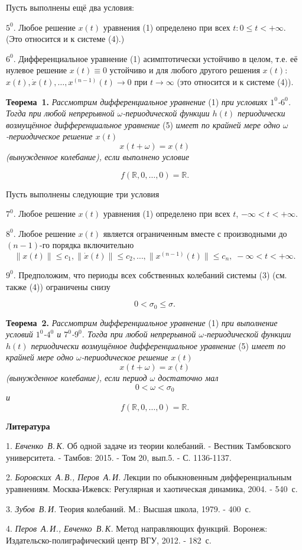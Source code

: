 Пусть выполнены ещё  два условия:

$5^0$. Любое решение $x(t)$ уравнения (1)  определено при всех $t:0\leqslant t< +\infty$.
(Это относится и к системе (4).)

$6^0$. Дифференциальное уравнение (1) асимптотически устойчиво в целом, т.е. её нулевое решение
$x(t)\equiv 0$ устойчиво и для любого другого решения $x(t)$:
$x(t), \dot x(t),\ldots , x^{(n-1)}(t)\rightarrow 0$ при  $t\rightarrow\infty$ (это относится и к системе (4)).

\textbf{Теорема~1.} {\it Рассмотрим дифференциальное уравнение} (1) {\it при условиях $1^0$-$6^0$. Тогда
	при любой непрерывной $\omega$-пе\-ри\-о\-ди\-чес\-кой функции  $h(t)$ периодически возмущённое дифференциальное
	уравнение} (5) {\it имеет по крайней мере одно $\omega$-периодическое решение  $x(t)$
		$$x(t+\omega)=x(t)$$
	(вынужденное колебание), если выполнено условие}

$$f(\mathbb{ R},0,\ldots,0)=\mathbb{ R}.$$



Пусть выполнены следующие три условия

$7^0$. Любое решение $x(t)$ уравнения (1) определено при всех $t$, $-\infty<t<+\infty$.

$8^0$. Любое решение $x(t)$ является ограниченным вместе с производными до $(n-1)$-го порядка включительно
$$\|x(t)\|\leqslant c_1, \|\dot{x}(t)\|\leqslant c_2, \ldots, \|x^{(n-1)}(t)\|\leqslant c_n,\;  -\infty<t<+\infty.$$

$9^0$. Предположим, что периоды всех собственных колебаний системы (3) (см. также (4)) ограничены снизу

$$ 0<\sigma_0 \leqslant \sigma. $$

\textbf{Теорема~2.} {\it Рассмотрим дифференциальное уравнение} (1) {\it при выполнение условий $1^0$-$4^0$ и $7^0$-$9^0$. Тогда
	при любой непрерывной  $\omega$-периодической функции  $h(t)$  периодически возмущённое дифференциальное
	уравнение} (5) {\it имеет по крайней мере одно $\omega$-периодическое решение  $x(t)$
		$$x(t+\omega)=x(t) $$
	(вынужденное колебание), если период $\omega$ достаточно мал
		$$0<\omega< \sigma_0 $$
	и}
$$f(\mathbb{ R},0,\ldots,0)=\mathbb{ R}.$$

\smallskip \centerline{\bf Литература}\nopagebreak

1.  {\it Евченко~В.\,К.} Об одной задаче из теории колебаний.
- Вестник Тамбовского университета. - Тамбов: 2015. - Том 20, вып.5. - С. 1136-1137.

2. {\it Боровских~А.\,В., Перов~А.\,И.} Лекции по обыкновенным дифференциальным
уравнениям. Москва-Ижевск: Регулярная и хаотическая динамика, 2004. - 540~с.

3. {\it Зубов~В.\,И.} Теория колебаний. М.: Высшая школа, 1979. - 400~с.

4. {\it Перов~А.\,И., Евченко~В.\,К.} Метод направляющих функций.
Воронеж: Издательско-полиграфический центр ВГУ, 2012. - 182~с.










